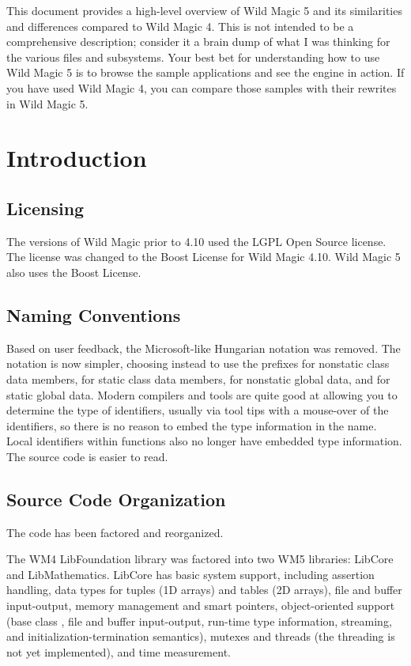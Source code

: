 \documentclass{article}
\begin{document}

This document provides a high-level overview of Wild Magic 5 and its
similarities and differences compared to Wild Magic 4.  This is not intended
to be a comprehensive description; consider it a brain dump of what I was
thinking for the various files and subsystems.  Your best bet for
understanding how to use Wild Magic 5 is to browse the sample applications
and see the engine in action.  If you have used Wild Magic 4, you can compare
those samples with their rewrites in Wild Magic 5.

\section{Introduction}

\subsection{Licensing}

The versions of Wild Magic prior to 4.10 used the LGPL Open Source license.
The license was changed to the Boost License for Wild Magic 4.10.  Wild Magic
5 also uses the Boost License.

\subsection{Naming Conventions}

Based on user feedback, the Microsoft-like Hungarian notation was removed.
The notation is now simpler, choosing instead to use the prefixes  for
nonstatic class data members,  for static class data members,
 for nonstatic global data, and  for static global data.
Modern compilers and tools are quite good at allowing you to determine the
type of identifiers, usually via tool tips with a mouse-over of the
identifiers, so there is no reason to embed the type information in the
name.  Local identifiers within functions also no longer have embedded type
information.  The source code is easier to read.

\subsection{Source Code Organization}

The code has been factored and reorganized.

The WM4 LibFoundation library was factored into two WM5 libraries: LibCore
and LibMathematics.  LibCore has basic system support, including assertion
handling, data types for tuples (1D arrays) and tables (2D arrays), file
and buffer input-output, memory management and smart pointers, object-oriented
support (base class , file and buffer input-output, run-time type
information, streaming, and initialization-termination semantics), mutexes
and threads (the threading is not yet implemented), and time measurement.
\end{document}
